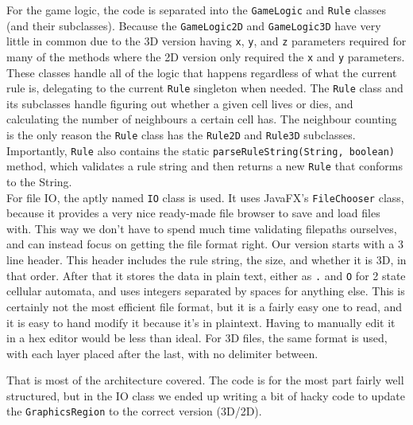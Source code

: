 \documentclass[11pt]{article}
\begin{document}
For the game logic, the code is separated into the \texttt{GameLogic} and \texttt{Rule} classes
(and their subclasses).  Because the \texttt{GameLogic2D} and \texttt{GameLogic3D} have very
little in common due to the 3D version having \texttt{x}, \texttt{y}, and \texttt{z} parameters required
for many of the methods where the 2D version only required the \texttt{x} and \texttt{y}
parameters.  These classes handle all of the logic that happens regardless of
what the current rule is, delegating to the current \texttt{Rule} singleton when needed.
The \texttt{Rule} class and its subclasses handle figuring out whether a given cell lives
or dies, and calculating the number of neighbours a certain cell has.  The
neighbour counting is the only reason the \texttt{Rule} class has the \texttt{Rule2D} and \texttt{Rule3D}
subclasses.  Importantly, \texttt{Rule} also contains the static \texttt{parseRuleString(String,
boolean)} method, which validates a rule string and then returns a new \texttt{Rule} that
conforms to the String.\\

For file IO, the aptly named \texttt{IO} class is used.  It uses JavaFX's \texttt{FileChooser}
class, because it provides a very nice ready-made file browser to save and load
files with.  This way we don't have to spend much time validating filepaths
ourselves, and can instead focus on getting the file format right.  Our version
starts with a 3 line header.  This header includes the rule string, the size,
and whether it is 3D, in that order.  After that it stores the data in plain
text, either as \texttt{.} and \texttt{O} for 2 state cellular automata, and uses integers
separated by spaces for anything else.  This is certainly not the most efficient
file format, but it is a fairly easy one to read, and it is easy to hand modify
it because it's in plaintext.  Having to manually edit it in a hex editor would
be less than ideal.  For 3D files, the same format is used, with each layer
placed after the last, with no delimiter between.

That is most of the architecture covered.  The code is for the most part fairly
well structured, but in the IO class we ended up writing a bit of hacky code to
update the \texttt{GraphicsRegion} to the correct version (3D/2D).
\end{document}
